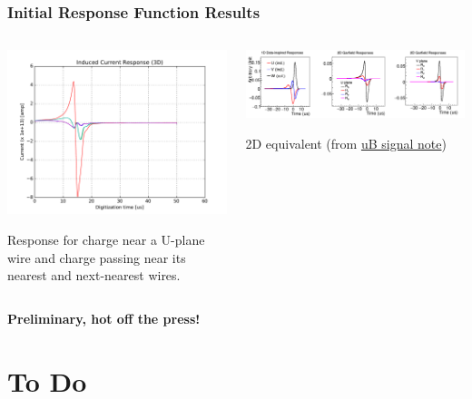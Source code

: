 \documentclass[xcolor=dvipsnames]{beamer}
\begin{document}
\begin{frame}
  \frametitle{Initial Response Function Results}
  \begin{columns}
    \begin{column}{0.7\textwidth}
      \includegraphics[width=\textwidth]{qad-response.pdf}

      \footnotesize
      Response for charge near a U-plane wire and charge passing near
      its nearest and next-nearest wires.

    \end{column}
    \begin{column}{0.3\textwidth}
      \includegraphics[width=\textwidth,clip,trim=15cm 0 15cm 0]{overall_response.png}      
      \scriptsize

      2D equivalent (from
      \href{http://www-microboone.fnal.gov/publications/publicnotes/MICROBOONE-NOTE-1017-PUB.pdf}{uB signal note})
    \end{column}
  \end{columns}
      \textbf{Preliminary, hot off the press!}

\end{frame}


\section{To Do}
\end{document}
